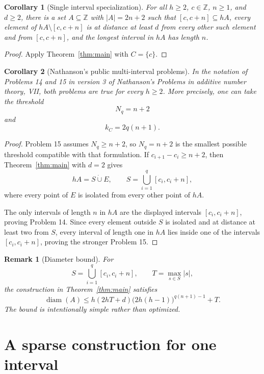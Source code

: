 \documentclass[11pt]{article}
\newtheorem{corollary}{Corollary}
\newtheorem{remark}{Remark}
\newcommand{\Z}{\mathbb{Z}}
\begin{document}
\begin{corollary}[Single interval specialization]\label{cor:single}
For all $h\geq 2$, $c\in\Z$, $n\geq 1$, and $d\geq 2$, there is a set
$A\subseteq\Z$ with $|A|=2n+2$ such that $[c,c+n]\subseteq hA$, every
element of $hA\setminus[c,c+n]$ is at distance at least $d$ from every
other such element and from $[c,c+n]$, and the longest interval in $hA$ has
length $n$.
\end{corollary}

\begin{proof}
Apply Theorem~\ref{thm:main} with $C=\{c\}$.
\end{proof}

\begin{corollary}[Nathanson's public multi-interval problems]\label{cor:problems}
In the notation of Problems 14 and 15 in version 3 of Nathanson's
\emph{Problems in additive number theory, VII}, both problems are true for
every $h\geq 2$.
More precisely, one can take the threshold
\[
 N_q=n+2
\]
and
\[
 k_C=2q(n+1).
\]
\end{corollary}

\begin{proof}
Problem 15 assumes $N_q\geq n+2$, so $N_q=n+2$ is the smallest possible
threshold compatible with that formulation. If $c_{i+1}-c_i\geq n+2$, then
Theorem~\ref{thm:main} with $d=2$ gives
\[
 hA=S\mathbin{\dot\cup}E,
 \qquad S=\bigcup_{i=1}^q[c_i,c_i+n],
\]
where every point of $E$ is isolated from every other point of $hA$.

The only intervals of length $n$ in $hA$ are the displayed intervals
$[c_i,c_i+n]$, proving Problem 14. Since every element outside $S$ is
isolated and at distance at least two from $S$, every interval of length one
in $hA$ lies inside one of the intervals $[c_i,c_i+n]$, proving the stronger
Problem 15.
\end{proof}

\begin{remark}[Diameter bound]
For
\[
 S=\bigcup_{i=1}^q[c_i,c_i+n],
 \qquad
 T=\max_{s\in S}|s|,
\]
the construction in Theorem~\ref{thm:main} satisfies
\[
 \operatorname{diam}(A)
 \leq h(2hT+d)\bigl(2h(h-1)\bigr)^{q(n+1)-1}+T.
\]
The bound is intentionally simple rather than optimized.
\end{remark}

\section{A sparse construction for one interval}
\end{document}
